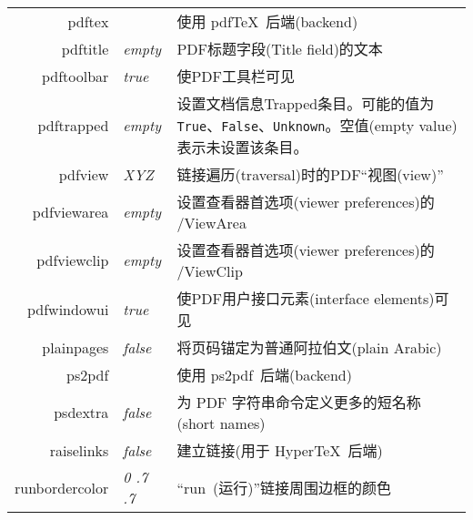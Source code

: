\documentclass{article}
\begin{document}
\begin{longtable}{@{}>{\ttfamily}rlp{7cm}@{}}
  pdftex                            &                        & 使用 \textsf{pdf\TeX}\ 后端(backend)                                                                \\
  pdftitle                          & \textit{empty}         & PDF标题字段(Title field)的文本                                                                         \\
  pdftoolbar                        & \textit{true}          & 使PDF工具栏可见                                                                                       \\
  pdftrapped                        & \textit{empty}         & 设置文档信息Trapped条目。可能的值为 \texttt{True}、\texttt{False}、\texttt{Unknown}。空值(empty value)表示未设置该条目。    \\
  pdfview                           & \textit{XYZ}           & 链接遍历(traversal)时的PDF“视图(view)”                                                                  \\
  pdfviewarea                       & \textit{empty}         & 设置查看器首选项(viewer preferences)的 /ViewArea                                                         \\
  pdfviewclip                       & \textit{empty}         & 设置查看器首选项(viewer preferences)的 /ViewClip                                                         \\
  pdfwindowui                       & \textit{true}          & 使PDF用户接口元素(interface elements)可见                                                                \\
  plainpages                        & \textit{false}         & 将页码锚定为普通阿拉伯文(plain Arabic)                                                                      \\
  ps2pdf                            &                        & 使用 \textsf{ps2pdf}\ 后端(backend)                                                                 \\
  psdextra                          & \textit{false}         & 为 PDF 字符串命令定义更多的短名称(short names)                                                                \\
  raiselinks                        & \textit{false}         & 建立链接(用于 \textsf{Hyper\TeX}\ 后端)                                                                 \\
  runbordercolor                    & \textit{0 .7 .7}       & “run~(运行)”链接周围边框的颜色                                                                             \\

\end{longtable}
\end{document}
